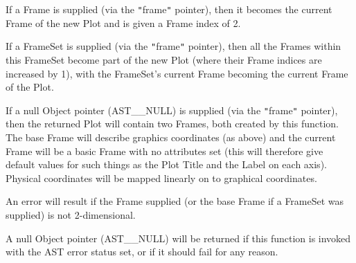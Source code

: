 \documentclass[twoside,11pt]{article}
\newcommand{\htmlref}[2]{#1}
\begin{document}
{{{         \sstitem
         If a Frame is supplied (via the {\tt{"}}frame{\tt{"}} pointer), then it
         becomes the current Frame of the new Plot and is given a Frame
         index of 2.

         \sstitem
         If a FrameSet is supplied (via the {\tt{"}}frame{\tt{"}} pointer), then
         all the Frames within this FrameSet become part of the new Plot
         (where their Frame indices are increased by 1), with the
         FrameSet's current Frame becoming the current Frame of the Plot.

         \sstitem
         If a null Object pointer (AST\_\_NULL) is supplied (via the
         {\tt{"}}frame{\tt{"}} pointer), then the returned Plot will contain two
         Frames, both created by this function. The base Frame will
         describe graphics coordinates (as above) and the current Frame
         will be a basic Frame with no attributes set (this will
         therefore give default values for such things as the Plot \htmlref{Title}{Title}
         and the Label on each axis). Physical coordinates will be mapped
         linearly on to graphical coordinates.

         \sstitem
         An error will result if the Frame supplied (or the base Frame
         if a FrameSet was supplied) is not 2-dimensional.

         \sstitem
         A null Object pointer (AST\_\_NULL) will be returned if this
         function is invoked with the AST error status set, or if it
         should fail for any reason.
      }
   }
}
\end{document}
